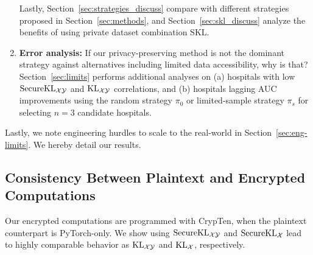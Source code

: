 \begin{enumerate}
Lastly, Section~\ref{sec:strategies_discuss} compare with different strategies proposed in Section~\ref{sec:methods}, and Section~\ref{sec:skl_discuss} analyze the benefits of using private dataset combination $\mathrm{SKL}$.
\item \textbf{Error analysis:} If our privacy-preserving method is not the dominant strategy against alternatives including limited data accessibility, why is that? Section~\ref{sec:limits} performs additional analyses on (a) hospitals with low $\mathrm{Secure}\mathrm{KL}_{\mathcal{X}\mathcal{Y}}$ and $\mathrm{KL}_{\mathcal{X}\mathcal{Y}}$ correlations, and (b) hospitals lagging AUC improvements using the random strategy $\pi_0$ or limited-sample strategy $\pi_s$ for selecting $n=3$ candidate hospitals.
\end{enumerate}

Lastly, we note engineering hurdles to scale to the real-world in Section~\ref{sec:eng-limits}. We hereby detail our results.

\subsection{Consistency Between Plaintext and Encrypted Computations}
\label{sec:consistency}
Our encrypted computations are programmed with CrypTen, when the plaintext counterpart is PyTorch-only. We show using $\mathrm{Secure}\mathrm{KL}_{\mathcal{X}\mathcal{Y}}$ and $\mathrm{Secure}\mathrm{KL}_\mathcal{X}$ lead to highly comparable behavior as $\mathrm{KL}_{\mathcal{X}\mathcal{Y}}$ and $\mathrm{KL}_\mathcal{X}$, respectively.

